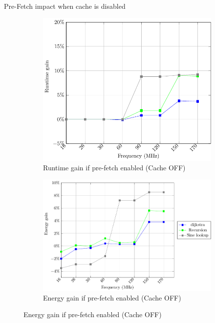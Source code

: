 \documentclass[
	11pt, %
]{beamer}
\begin{document}
\begin{frame}{Pre-Fetch impact when cache is disabled}
	\begin{figure}
		\begin{subfigure}{0.4\textwidth}
			\includegraphics[scale = 0.4]{data/stm32g_v2/pre_fetch_impact_cache_off/duration.pdf}
			\caption{Runtime gain if pre-fetch enabled (Cache OFF)}
		\end{subfigure}
		\begin{subfigure}{0.4\textwidth}
			\includegraphics[scale = 0.4]{data/stm32g_v2/pre_fetch_impact_cache_off/energy.pdf}
			\caption{Energy gain if pre-fetch enabled (Cache OFF)}
		\end{subfigure}
	\end{figure}
\end{frame}
\end{document}
